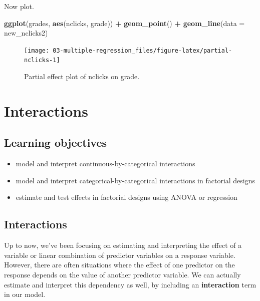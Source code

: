 \documentclass[]{book}
\newenvironment{Shaded}{\begin{snugshade}}{\end{snugshade}}
\newcommand{\DataTypeTok}[1]{\textcolor[rgb]{0.13,0.29,0.53}{#1}}
\newcommand{\KeywordTok}[1]{\textcolor[rgb]{0.13,0.29,0.53}{\textbf{#1}}}
\newcommand{\NormalTok}[1]{#1}
\newcommand{\OperatorTok}[1]{\textcolor[rgb]{0.81,0.36,0.00}{\textbf{#1}}}
\newcommand{\StringTok}[1]{\textcolor[rgb]{0.31,0.60,0.02}{#1}}
\providecommand{\tightlist}{%
  \setlength{\itemsep}{0pt}\setlength{\parskip}{0pt}}
\begin{document}
Now plot.

\begin{Shaded}
\begin{Highlighting}[]
\KeywordTok{ggplot}\NormalTok{(grades, }\KeywordTok{aes}\NormalTok{(nclicks, grade)) }\OperatorTok{+}
\StringTok{  }\KeywordTok{geom_point}\NormalTok{() }\OperatorTok{+}
\StringTok{  }\KeywordTok{geom_line}\NormalTok{(}\DataTypeTok{data =}\NormalTok{ new_nclicks2)}
\end{Highlighting}
\end{Shaded}

\begin{figure}

{\centering \texttt{[image: 03-multiple-regression\_files/figure-latex/partial-nclicks-1]} 

}

\caption{Partial effect plot of nclicks on grade.}\label{fig:partial-nclicks}
\end{figure}

\hypertarget{interactions}{%
\chapter{Interactions}\label{interactions}}

\hypertarget{learning-objectives}{%
\section{Learning objectives}\label{learning-objectives}}

\begin{itemize}
\tightlist
\item
  model and interpret continuous-by-categorical interactions
\item
  model and interpret categorical-by-categorical interactions in factorial designs
\item
  estimate and test effects in factorial designs using ANOVA or regression
\end{itemize}

\hypertarget{interactions-1}{%
\section{Interactions}\label{interactions-1}}

Up to now, we've been focusing on estimating and interpreting the effect of a variable or linear combination of predictor variables on a response variable. However, there are often situations where the effect of one predictor on the response depends on the value of another predictor variable. We can actually estimate and interpret this dependency as well, by including an \textbf{interaction} term in our model.
\end{document}
